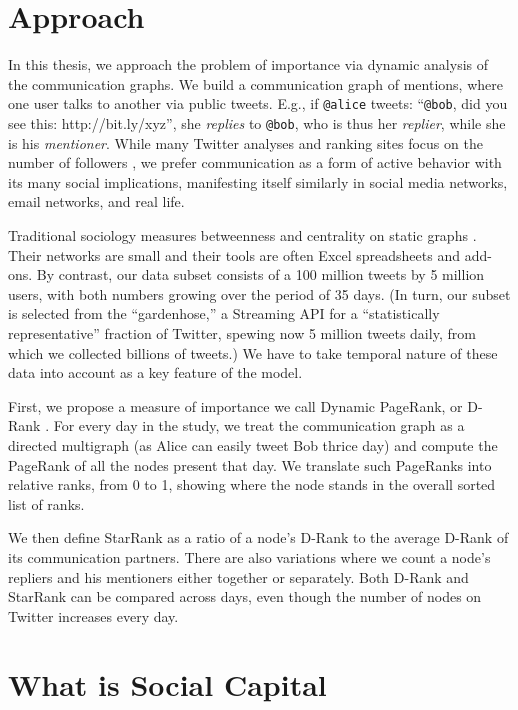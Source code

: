 \documentclass[10pt,oneside]{memoir}
\begin{document}
\section{Approach}
\label{approach}

In this thesis, we approach the problem of importance via dynamic analysis of the communication graphs. We build a communication graph of mentions, where one user talks to another via public tweets. E.g., if \texttt{@alice} tweets: ``\texttt{@bob}, did you see this: http://bit.ly/xyz'', she {\itshape replies} to \texttt{@bob}, who is thus her {\itshape replier}, while she is his {\itshape mentioner}. While many Twitter analyses and ranking sites focus on the number of followers \cite{DBLP:conf/kdd/JavaSFT07}, we prefer communication as a form of active behavior with its many social implications, manifesting itself similarly in social media networks, email networks, and real life.


Traditional sociology measures betweenness and centrality on static graphs \cite{bonacich1987power}. Their networks are small and their tools are often Excel spreadsheets and add-ons. By contrast, our data subset consists of a 100 million tweets by 5 million users, with both numbers growing over the period of 35 days. (In turn, our subset is selected from the ``gardenhose,'' a Streaming API for a ``statistically representative'' fraction of Twitter, spewing now 5 million tweets daily, from which we collected billions of tweets.) We have to take temporal nature of these data into account as a key feature of the model.


First, we propose a measure of importance we call Dynamic PageRank, or D-Rank \cite{Khrabrov:2010:Dynamic}. For every day in the study, we treat the communication graph as a directed multigraph (as Alice can easily tweet Bob thrice day) and compute the PageRank of all the nodes present that day. We translate such PageRanks into relative ranks, from 0 to 1, showing where the node stands in the overall sorted list of ranks.


We then define StarRank as a ratio of a node's D-Rank to the average D-Rank of its communication partners. There are also variations where we count a node's repliers and his mentioners either together or separately. Both D-Rank and StarRank can be compared across days, even though the number of nodes on Twitter increases every day.


\pagebreak \section{What is Social Capital}
\label{whatissocialcapital}
\end{document}
